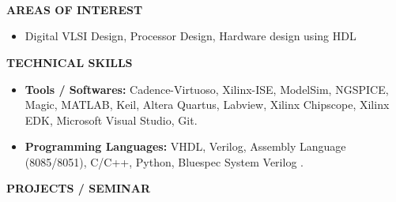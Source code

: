 \documentclass[a4paper,10pt]{article}
\begin{document}
{\qquad \\ \\ \\ \\ \\ \\ \\ \\ \\ \\ \\ \\ \\}

 \colorbox{titleColor}{\parbox{6.5in}{\textbf{AREAS OF INTEREST}}}

 \begin{itemize}
  \setlength{\itemsep}{1pt}

  \item {{  Digital VLSI Design, Processor Design, Hardware design using HDL}}
 \end{itemize}

 \colorbox{titleColor}{\parbox{6.5in}{\textbf{TECHNICAL SKILLS}}}

 \begin{itemize}
  \setlength{\itemsep}{1pt}

  \item \textbf{{Tools / Softwares:}} Cadence-Virtuoso, Xilinx-ISE, ModelSim, NGSPICE, Magic, MATLAB, Keil, Altera Quartus, Labview, Xilinx Chipscope, Xilinx EDK, Microsoft Visual Studio, Git.

  \item \textbf{{Programming Languages:}} VHDL, Verilog, Assembly Language (8085/8051), C/C++, Python, Bluespec System Verilog .
 \end{itemize}

 \colorbox{titleColor}{\parbox{6.5in}{\textbf{PROJECTS / SEMINAR}}}
\end{document}
